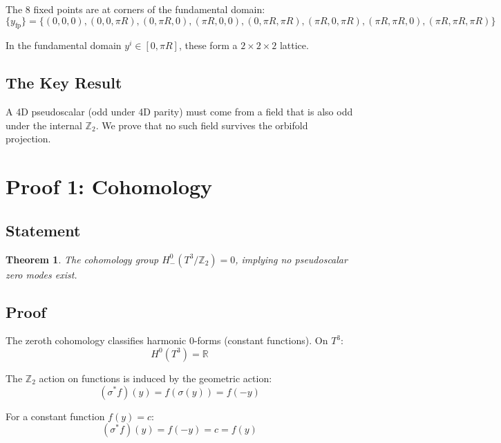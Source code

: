\documentclass[12pt,a4paper]{article}
\newtheorem{theorem}{Theorem}
\begin{document}
The 8 fixed points are at corners of the fundamental domain:
\begin{equation}
\{y_{\text{fp}}\} = \{(0,0,0), (0,0,\pi R), (0,\pi R,0), (\pi R,0,0), (0,\pi R,\pi R), (\pi R,0,\pi R), (\pi R,\pi R,0), (\pi R,\pi R,\pi R)\}
\end{equation}

In the fundamental domain $y^i \in [0, \pi R]$, these form a $2 \times 2 \times 2$ lattice.

\subsection{The Key Result}

A 4D pseudoscalar (odd under 4D parity) must come from a field that is also odd under the internal $\mathbb{Z}_2$. We prove that no such field survives the orbifold projection.

\section{Proof 1: Cohomology}

\subsection{Statement}

\begin{theorem}
The cohomology group $H^0_-(T^3/\mathbb{Z}_2) = 0$, implying no pseudoscalar zero modes exist.
\end{theorem}

\subsection{Proof}

The zeroth cohomology classifies harmonic 0-forms (constant functions). On $T^3$:
\begin{equation}
H^0(T^3) = \mathbb{R}
\end{equation}

The $\mathbb{Z}_2$ action on functions is induced by the geometric action:
\begin{equation}
(\sigma^* f)(y) = f(\sigma(y)) = f(-y)
\end{equation}

For a constant function $f(y) = c$:
\begin{equation}
(\sigma^* f)(y) = f(-y) = c = f(y)
\end{equation}
\end{document}
